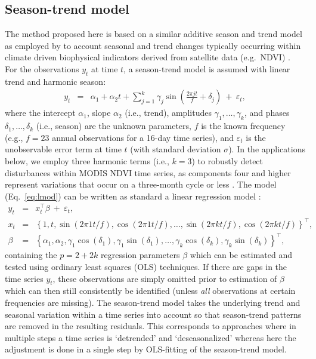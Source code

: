 \documentclass[authoryear,preprint,review,10pt]{elsarticle}
\begin{document}
\subsection{Season-trend model}\label{sec:seasontrendmodel}

The method proposed here is based on a similar additive season and trend model as employed by \citet{Verbesselt:2010wo} to account seasonal and trend changes typically occurring within climate driven biophysical indicators derived from satellite data (e.g.\ NDVI)  \citep{Beurs2005a}. For the observations $y_t$ at time $t$, a season-trend model is assumed with linear trend and harmonic season:
%
\begin{eqnarray} \label{eq:lmod}
  y_t & = & \alpha_1 + \alpha_2 t + \sum_{j = 1}^k \gamma_{j} \sin \left(\frac{2\pi j t}{f} + \delta_{j} \right) ~+~ \varepsilon_t,
\end{eqnarray}
%
where the intercept $\alpha_1$, slope $\alpha_2$ (i.e., trend), amplitudes $\gamma_1, \dots, \gamma_k$,
and phases $\delta_1, \dots, \delta_k$ (i.e., season) are the unknown parameters,
$f$ is the known frequency (e.g., $f = 23$ annual observations for a 16-day time series),
and $\varepsilon_t$ is the unobservable error term at time $t$ (with standard deviation $\sigma$). In the applications
below, we employ three harmonic terms (i.e., $k = 3$) to robustly detect disturbances within MODIS NDVI time series, as components four and higher represent variations
that occur on a three-month cycle or less \citep{Geerken2009,Julien2010}. The model (Eq.~\ref{eq:lmod}) can be written as standard a linear regression model \citep[see e.g.,][Chapter~3.3]{Cryer2008}:
%
\begin{eqnarray*} \label{eq:OLSlmod}
  y_t   & = & x_t^\top \beta ~+~ \varepsilon_t, \\
  x_t   & = & \left\{1, t, \sin(2 \pi 1 t / f), \cos(2 \pi 1 t / f),
              \dots, \sin(2 \pi k t / f), \cos(2 \pi k t / f)\right\}^\top, \\
  \beta & = & \left\{\alpha_1, \alpha_2, \gamma_1 \cos(\delta_1), \gamma_1 \sin(\delta_1),
              \dots, \gamma_k \cos(\delta_k), \gamma_k \sin(\delta_k)\right\}^\top,
\end{eqnarray*}
%
containing the $p = 2 + 2 k$ regression parameters $\beta$ which can be estimated and tested using ordinary least squares (OLS) techniques. 
If there are gaps in the time series $y_t$, these observations are simply omitted prior to estimation of $\beta$ which can then still consistently 
be identified (unless \emph{all} observations at certain frequencies are missing). The season-trend model takes the underlying trend and seasonal variation within a time series into account so that season-trend patterns are removed in the resulting residuals. This corresponds to approaches where in multiple steps a time series is `detrended' and `deseasonalized' \citep{Potter2003} whereas here the adjustment is done in a single step by OLS-fitting of the season-trend model.
\end{document}
